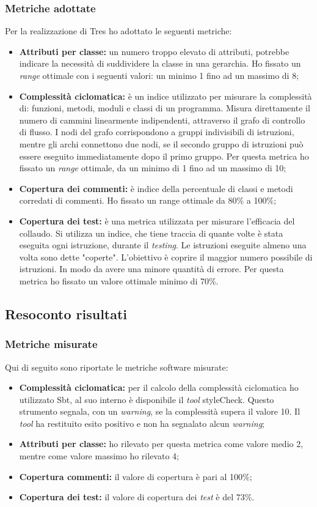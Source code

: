 \subsubsection{Metriche adottate}
Per la realizzazione di Tres ho adottato le seguenti metriche:
\begin{itemize}
\item \textbf{Attributi per classe:} un numero troppo elevato di attributi, potrebbe indicare la necessità di suddividere la classe in una gerarchia. Ho fissato un \emph{range} ottimale con i seguenti valori: un minimo 1 fino ad un massimo di 8;
\item \textbf{Complessità ciclomatica:} è un indice utilizzato per misurare la complessità di: funzioni, metodi, moduli e classi di un programma. Misura direttamente il numero di cammini linearmente indipendenti, attraverso il grafo di controllo di flusso. I nodi del grafo corrispondono a gruppi indivisibili di istruzioni, mentre gli archi connettono due nodi, se il secondo gruppo di istruzioni può essere eseguito immediatamente dopo il primo gruppo. Per questa metrica ho fissato un \textit{range} ottimale, da un minimo di 1 fino ad un massimo di 10;
\item \textbf{Copertura dei commenti:} è indice della percentuale di classi e metodi corredati di commenti. Ho fissato un range ottimale da 80\% a 100\%;
\item \textbf{Copertura dei test:} è una metrica utilizzata per misurare l'efficacia del collaudo. Si utilizza un indice, che tiene traccia di quante volte è stata eseguita ogni istruzione, durante il \emph{testing}. Le istruzioni eseguite almeno una volta sono dette "coperte". L'obiettivo è coprire il maggior numero possibile di istruzioni. In modo da avere una minore quantità di errore. Per questa metrica ho fissato un valore ottimale minimo di 70\%.
\end{itemize}
\subsection{Resoconto risultati}
\subsubsection{Metriche misurate}
Qui di seguito sono riportate le metriche software misurate:
\begin{itemize}
\item \textbf{Complessità ciclomatica:} per il calcolo della complessità ciclomatica ho utilizzato Sbt, al suo interno è disponibile il \emph{tool} styleCheck. Questo strumento segnala, con un \emph{warning}, se la complessità supera il valore 10. Il \emph{tool} ha restituito esito positivo e non ha segnalato alcun \emph{warning};
\item \textbf{Attributi per classe:} ho rilevato per questa metrica come valore medio 2, mentre come valore massimo ho rilevato 4;
\item \textbf{Copertura commenti:} il valore di copertura è pari al 100\%;
\item \textbf{Copertura dei test:} il valore di copertura dei \emph{test} è del 73\%.
\end{itemize}
\newpage
